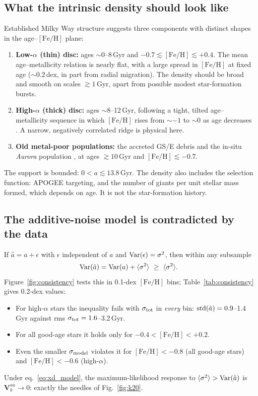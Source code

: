 \documentclass[11pt,a4paper]{article}
\newcommand{\feh}{\ensuremath{[\mathrm{Fe/H}]}}
\begin{document}
\subsection{What the intrinsic density should look like}
\label{sec:expect}
Established Milky Way structure suggests three components with distinct shapes in the age--\feh{} plane:
\begin{enumerate}
  \item \textbf{Low-$\alpha$ (thin) disc:} ages $\sim0$--8\,Gyr and $-0.7\lesssim\feh\lesssim+0.4$. The mean age--metallicity relation is nearly flat, with a large spread in \feh{} at fixed age ($\sim0.2$\,dex, in part from radial migration). The density should be broad and smooth on scales $\gtrsim1$\,Gyr, apart from possible modest star-formation bursts.
  \item \textbf{High-$\alpha$ (thick) disc:} ages $\sim8$--12\,Gyr, following a tight, tilted age--metallicity sequence in which \feh{} rises from $\sim-1$ to $\sim0$ as age decreases \citep{Haywood2013}. A narrow, negatively correlated ridge is physical here.
  \item \textbf{Old metal-poor populations:} the accreted GS/E debris \citep{Belokurov2018,Helmi2018} and the in-situ \textit{Aurora} population \citep{Belokurov2022}, at ages $\gtrsim10$\,Gyr and $\feh\lesssim-0.7$.
\end{enumerate}
The support is bounded: $0<a\lesssim13.8$\,Gyr. The density also includes the selection function: APOGEE targeting, and the number of giants per unit stellar mass formed, which depends on age. It is not the star-formation history.

\subsection{The additive-noise model is contradicted by the data}
\label{sec:test}
If $\hat a=a+\epsilon$ with $\epsilon$ independent of $a$ and ${\rm Var}(\epsilon)=\sigma^2$, then within any subsample
\begin{equation}
  {\rm Var}(\hat a)={\rm Var}(a)+\langle\sigma^2\rangle\ \ge\ \langle\sigma^2\rangle .
  \label{eq:additive}
\end{equation}
Figure~\ref{fig:consistency} tests this in 0.1-dex \feh{} bins; Table~\ref{tab:consistency} gives 0.2-dex values:
\begin{itemize}
  \item For high-$\alpha$ stars the inequality fails with $\sigma_{\rm tot}$ in \emph{every} bin: ${\rm std}(\hat a)=0.9$--1.4\,Gyr against rms $\sigma_{\rm tot}=1.6$--3.2\,Gyr.
  \item For all good-age stars it holds only for $-0.4<\feh<+0.2$.
  \item Even the smaller $\sigma_{\rm model}$ violates it for $\feh<-0.8$ (all good-age stars) and $\feh<-0.6$ (high-$\alpha$).
\end{itemize}
Under eq.~\eqref{eq:xd_model}, the maximum-likelihood response to $\langle\sigma^2\rangle>{\rm Var}(\hat a)$ is $\mathbf V_k^{aa}\to0$: exactly the needles of Fig.~\ref{fig:k20}.
\end{document}

